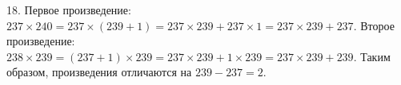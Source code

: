 18. Первое произведение: $237\times240=237\times(239+1)=237\times239+237\times1=237\times239+237.$ Второе произведение: $238\times239=(237+1)\times239=237\times239+1\times239=237\times 239+239.$ Таким образом, произведения отличаются на $239-237=2.$\\
